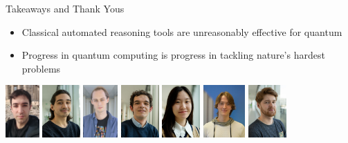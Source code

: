 \begin{refsection}
\begin{frame}{Takeaways and Thank Yous}

\vspace{-1em}

\begin{itemize}
	\item Classical automated reasoning tools are unreasonably effective for quantum
	\item Progress in quantum computing is progress in tackling nature's hardest problems
\end{itemize}


\vspace{2em}

\pause

\includegraphics[height=2cm]{graphics/dimitrios}
\includegraphics[height=2cm]{graphics/villoria_alejandro.jpg}
\includegraphics[height=2cm]{graphics/brand.png}
\includegraphics[height=2cm]{graphics/quist_arend-jan.jpg}
\includegraphics[height=2cm]{graphics/mei.png}
\includegraphics[height=2cm]{graphics/lieuwe.jpeg}
\includegraphics[height=2cm]{graphics/coopmans_tim}


\end{frame}
\end{refsection}
